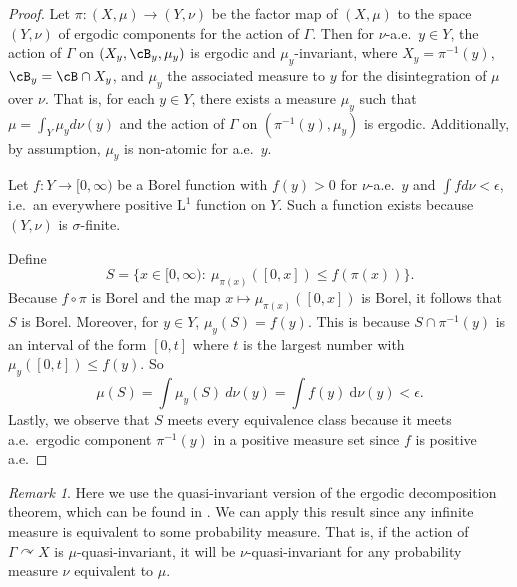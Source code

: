 \documentclass[12pt]{article}
\theoremstyle{plain}
\theoremstyle{definition}
\theoremstyle{remark}
\newtheorem{remark}{Remark}
\newcommand{\G}{\Gamma}
\newcommand{\eps}{\epsilon}
\newcommand\Meas{{\operatorname{Meas}}}
\def\cc{{\curvearrowright}}
\newcommand{\dee}{\textrm{d}}
\newcommand{\rL}{\textrm{L}}
\begin{document}
\begin{proof}
    
    Let $\pi: (X, \mu) \to (Y,\nu)$ be the factor map of $(X,\mu)$ to the space $(Y, \nu)$ of ergodic components for the action of $\G$. Then for $\nu$-a.e.\ $y\in Y$, the action of $\G$ on  $(X_y, \cB_y,  \mu_y)$ is ergodic and $\mu_y$-invariant, where $X_y = \pi^{-1}(y)$, $\cB_y = \cB \cap X_y$, and $\mu_y$ the associated measure to $y$ for the disintegration of $\mu$ over $\nu$. That is, for each $y \in Y$, there exists a measure $\mu_y$ such that $\mu = \int_Y \mu_y d\nu(y)$ and the action of $\G$ on $(\pi^{-1}(y), \mu_y)$ is ergodic. Additionally, by assumption, $\mu_y$ is non-atomic for a.e.\ $y$.


    
    Let $f: Y \to [0, \infty)$ be a Borel function with $f(y) > 0$ for $\nu$-a.e.~$y$ and $\int f d\nu < \eps$, i.e.\ an everywhere positive $\rL^1$ function on $Y$. Such a function exists because $(Y,\nu)$ is $\sigma$-finite.

Define
$$S=\{x\in [0,\infty):~ \mu_{\pi(x)}([0,x])\le f(\pi(x))\}.$$
Because $f\circ \pi$ is Borel and the map $x\mapsto\mu_{\pi(x)}([0,x])$ is Borel, it follows that $S$ is Borel. Moreover, for $y\in Y$, $\mu_y(S)=f(y)$. This is because $S \cap \pi^{-1}(y)$ is an interval of the form $[0,t]$ where $t$ is the largest number with $\mu_{y}([0,t])\le f(y)$. So
$$\mu(S) = \int \mu_{y}(S)~d\nu(y) = \int f(y)~\dee\nu(y)<\eps.$$
Lastly, we observe that $S$ meets every equivalence class because it meets a.e.\ ergodic component $\pi^{-1}(y)$ in a positive measure set since $f$ is positive a.e.
\end{proof}






\begin{remark}
    Here we use the quasi-invariant version of the ergodic decomposition theorem, which can be found in \cite{MR1784210}. We can apply this result since any infinite measure is equivalent to some probability measure. That is, if the action of $\G \cc X$ is $\mu$-quasi-invariant, it will be $\nu$-quasi-invariant for any probability measure $\nu$ equivalent to $\mu$.
\end{remark}
\end{document}
